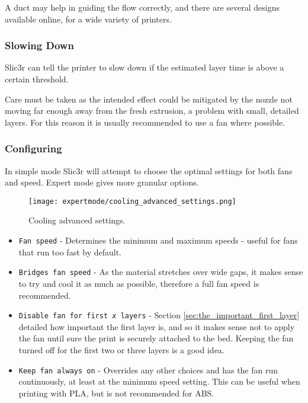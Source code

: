 A duct may help in guiding the flow correctly, and there are several designs available online, for a wide variety of printers.


\subsubsection{Slowing Down} %
\label{sub:slowing_down}
Slic3r can tell the printer to slow down if the estimated layer time is above a certain threshold.

Care must be taken as the intended effect could be mitigated by the nozzle not moving far enough away from the fresh extrusion, a problem with small, detailed layers.  For this reason it is usually recommended to use a fan where possible.


\subsubsection{Configuring} %
\label{sub:configuring_cooling}

In simple mode Slic3r will attempt to choose the optimal settings for both fans and speed.  Expert mode gives more granular options.  

\begin{figure}[H]
\centering
\texttt{[image: expertmode/cooling\_advanced\_settings.png]}
\caption{Cooling advanced settings.}
\label{fig:cooling_advanced_settings}
\end{figure}

\begin{itemize}
	\item \texttt{Fan speed}  - Determines the minimum and maximum speeds - useful for fans that run too fast by default.
	\item \texttt{Bridges fan speed}  - As the material stretches over wide gaps, it makes sense to try and cool it as much as possible, therefore a full fan speed is recommended.
	\item \texttt{Disable fan for first \textit{x} layers}  - Section \ref{sec:the_important_first_layer} detailed how important the first layer is, and so it makes sense not to apply the fan until sure the print is securely attached to the bed.  Keeping the fan turned off for the first two or three layers is a good idea.
	\item \texttt{Keep fan always on}  - Overrides any other choices and has the fan run continuously, at least at the minimum speed setting.  This can be useful when printing with PLA, but is not recommended for ABS.	
\end{itemize}

